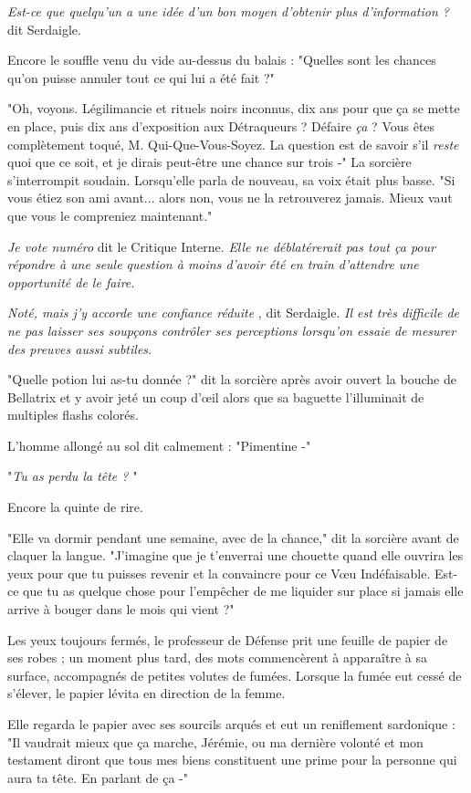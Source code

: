 \emph{Est-ce que quelqu'un a une idée d'un bon moyen d'obtenir plus d'information ?}  dit Serdaigle.

Encore le souffle venu du vide au-dessus du balais : "Quelles sont les chances qu'on puisse annuler tout ce qui lui a été fait ?"

"Oh, voyons. Légilimancie et rituels noirs inconnus, dix ans pour que ça se mette en place, puis dix ans d'exposition aux Détraqueurs ? Défaire \emph{ça}  ? Vous êtes complètement toqué, M. Qui-Que-Vous-Soyez. La question est de savoir s'il \emph{reste}  quoi que ce soit, et je dirais peut-être une chance sur trois -" La sorcière s'interrompit soudain. Lorsqu'elle parla de nouveau, sa voix était plus basse. "Si vous étiez son ami avant... alors non, vous ne la retrouverez jamais. Mieux vaut que vous le compreniez maintenant."

\emph{Je vote numéro}  dit le Critique Interne. \emph{Elle ne déblatérerait pas tout ça pour répondre à une seule question à moins d'avoir été en train d'attendre une opportunité de le faire.} 

\emph{Noté, mais j'y accorde une confiance réduite} , dit Serdaigle. \emph{Il est très difficile de ne pas laisser ses soupçons contrôler ses perceptions lorsqu'on essaie de mesurer des preuves aussi subtiles.} 

"Quelle potion lui as-tu donnée ?" dit la sorcière après avoir ouvert la bouche de Bellatrix et y avoir jeté un coup d'œil alors que sa baguette l'illuminait de multiples flashs colorés.

L'homme allongé au sol dit calmement : "Pimentine -"

"\emph{Tu as perdu la tête ?} "

Encore la quinte de rire.

"Elle va dormir pendant une semaine, avec de la chance," dit la sorcière avant de claquer la langue. "J'imagine que je t'enverrai une chouette quand elle ouvrira les yeux pour que tu puisses revenir et la convaincre pour ce Vœu Indéfaisable. Est-ce que tu as quelque chose pour l'empêcher de me liquider sur place si jamais elle arrive à bouger dans le mois qui vient ?"

Les yeux toujours fermés, le professeur de Défense prit une feuille de papier de ses robes ; un moment plus tard, des mots commencèrent à apparaître à sa surface, accompagnés de petites volutes de fumées. Lorsque la fumée eut cessé de s'élever, le papier lévita en direction de la femme.

Elle regarda le papier avec ses sourcils arqués et eut un reniflement sardonique : "Il vaudrait mieux que ça marche, Jérémie, ou ma dernière volonté et mon testament diront que tous mes biens constituent une prime pour la personne qui aura ta tête. En parlant de ça -"

